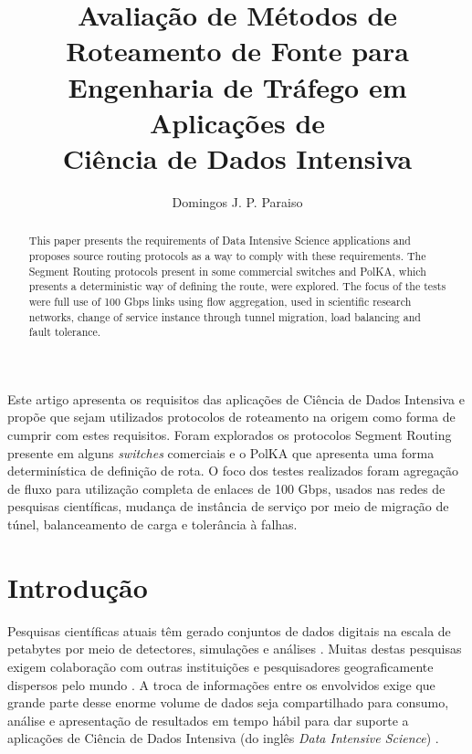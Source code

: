 \documentclass[12pt]{article}
\title{Avaliação de Métodos de Roteamento de Fonte para Engenharia de Tráfego em Aplicações de\\ Ciência de Dados Intensiva}
\author{Domingos J. P. Paraiso\inst{1}  }
\begin{document}
 

\maketitle

\begin{abstract}
  This paper presents the requirements of Data Intensive Science applications and proposes source routing protocols as a way to comply with these requirements. The Segment Routing protocols present in some commercial switches and PolKA, which presents a deterministic way of defining the route, were explored. The focus of the tests were full use of 100 Gbps links using flow aggregation, used in scientific research networks, change of service instance through tunnel migration, load balancing and fault tolerance.
\end{abstract}

\begin{resumo} 
  Este artigo apresenta os requisitos das aplicações de Ciência de Dados Intensiva e propõe que sejam utilizados protocolos de roteamento na origem como forma de cumprir com estes requisitos. Foram explorados os protocolos Segment Routing presente em alguns \textit{switches} comerciais e o PolKA que apresenta uma forma determinística de definição de rota. O foco dos testes realizados foram agregação de fluxo para utilização completa de enlaces de 100 Gbps, usados nas redes de pesquisas científicas, mudança de instância de serviço por meio de migração de túnel, balanceamento de carga e tolerância à falhas.
\end{resumo}

\section{Introdução}


Pesquisas científicas atuais têm gerado conjuntos de dados digitais na escala de petabytes por meio de detectores, simulações e análises \cite{zurawski2021}. Muitas destas pesquisas exigem colaboração com outras instituições e pesquisadores geograficamente dispersos pelo mundo \cite{babik2020network}. A troca de informações entre os envolvidos exige que grande parte desse enorme volume de dados seja compartilhado para consumo, análise e apresentação de resultados em tempo hábil para dar suporte a aplicações de Ciência de Dados Intensiva (do inglês \textit{Data Intensive Science}) \cite{guiang2022integrating}.
\end{document}
